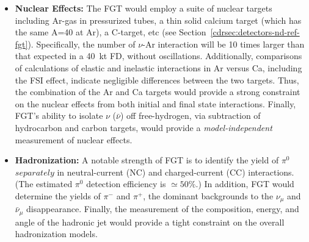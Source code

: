 \begin{itemize}
    \item {\bf Nuclear Effects:} The FGT would employ a suite of
      nuclear targets including Ar-gas in pressurized tubes, a thin
      solid calcium target (which has the same A=40 at Ar), a
      C-target, etc (see Section~\ref{cdrsec:detectors-nd-ref-fgt}).
      Specifically, the number of $\nu$-Ar interaction will be 10
      times larger than that expected in a 40~kt FD, without
      oscillations. Additionally, comparisons of calculations of
      elastic and inelastic interactions in Ar versus Ca, including
      the FSI effect, indicate negligible differences between the two
      targets. Thus, the combination of the Ar and Ca targets would
      provide a strong constraint on the nuclear effects from both
      initial and final state interactions.  Finally, FGT's ability to
      isolate $\nu$ ($\bar\nu$) off free-hydrogen, via subtraction of
      hydrocarbon and carbon targets, would provide a 
      {\em model-independent} measurement of nuclear effects.

    \item {\bf  Hadronization:} A notable strength of FGT is to identify the yield of $\pi^0$ $separately$ in neutral-current 
    (NC) and charged-current (CC) interactions. (The estimated $\pi^0$ detection efficiency is $\simeq 50\%$.) In addition, 
    FGT would determine the yields of $\pi^-$ and $\pi^+$, the dominant backgrounds to the $\nu_\mu$ and 
    $\bar\nu_\mu$ disappearance. Finally, the measurement of the composition, energy, and angle of the hadronic jet 
    would provide a tight constraint on the overall hadronization models. 


\end{itemize}
